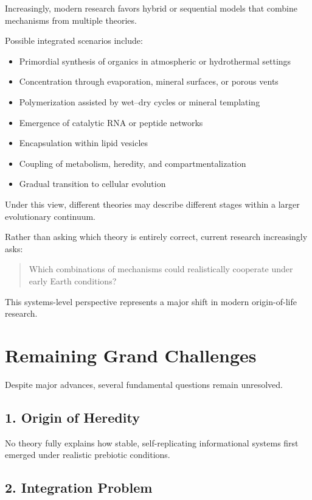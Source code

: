 \documentclass[
  oneside]{book}
\providecommand{\tightlist}{%
  \setlength{\itemsep}{0pt}\setlength{\parskip}{0pt}}
\begin{document}
Increasingly, modern research favors hybrid or sequential models that combine mechanisms from multiple theories.

Possible integrated scenarios include:

\begin{itemize}
\tightlist
\item
  Primordial synthesis of organics in atmospheric or hydrothermal settings
\item
  Concentration through evaporation, mineral surfaces, or porous vents
\item
  Polymerization assisted by wet--dry cycles or mineral templating
\item
  Emergence of catalytic RNA or peptide networks
\item
  Encapsulation within lipid vesicles
\item
  Coupling of metabolism, heredity, and compartmentalization
\item
  Gradual transition to cellular evolution
\end{itemize}

Under this view, different theories may describe different stages within a larger evolutionary continuum.

Rather than asking which theory is entirely correct, current research increasingly asks:

\begin{quote}
Which combinations of mechanisms could realistically cooperate under early Earth conditions?
\end{quote}

This systems-level perspective represents a major shift in modern origin-of-life research.

\section{Remaining Grand Challenges}\label{remaining-grand-challenges}

Despite major advances, several fundamental questions remain unresolved.

\subsection{1. Origin of Heredity}\label{origin-of-heredity}

No theory fully explains how stable, self-replicating informational systems first emerged under realistic prebiotic conditions.

\subsection{2. Integration Problem}\label{integration-problem}
\end{document}

